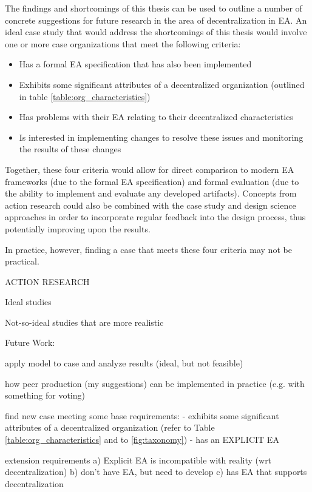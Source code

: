 The findings and shortcomings of this thesis can be used to outline a number of concrete suggestions for future research in the area of decentralization in EA. An ideal case study that would address the shortcomings of this thesis would involve one or more case organizations that meet the following criteria:

\begin{itemize}
\item Has a formal EA specification that has also been implemented
\item Exhibits some significant attributes of a decentralized organization (outlined in table \ref{table:org_characteristics})
\item Has problems with their EA relating to their decentralized characteristics
\item Is interested in implementing changes to resolve these issues and monitoring the results of these changes
\end{itemize}

Together, these four criteria would allow for direct comparison to modern EA frameworks (due to the formal EA specification) and formal evaluation (due to the ability to implement and evaluate any developed artifacts). Concepts from action research could also be combined with the case study and design science approaches in order to incorporate regular feedback into the design process, thus potentially improving upon the results. 

In practice, however, finding a case that meets these four criteria may not be practical. 

ACTION RESEARCH

Ideal studies

Not-so-ideal studies that are more realistic

Future Work:

apply model to case and analyze results (ideal, but not feasible)

how peer production (my suggestions) can be implemented in practice (e.g. with something for voting)

find new case meeting some base requirements:
 - exhibits some significant attributes of a decentralized organization (refer to Table \ref{table:org_characteristics} and to \ref{fig:taxonomy})
 - has an EXPLICIT EA

extension requirements
 a) Explicit EA is incompatible with reality (wrt decentralization)
 b) don't have EA, but need to develop
 c) has EA that supports decentralization